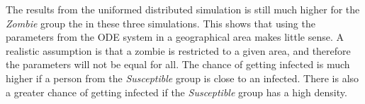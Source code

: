 \documentclass[%
twoside,                 %
final,                   %
chapterprefix=true,      %
open=right               %
10pt]{book}
\begin{document}
\vspace{3mm}




\vspace{3mm}


The results from the uniformed distributed simulation is still much higher for the \emph{Zombie} group the in these three simulations. This shows that using the parameters from the ODE system in a geographical area makes little sense. A realistic assumption is that a zombie is restricted to a given area, and therefore the parameters will not be equal for all. The chance of getting infected is much higher if a person from the  \emph{Susceptible} group is close to an infected. There is also a greater chance of getting infected if the \emph{Susceptible} group has a high density. 








\label{table:compare_towns}
\end{document}
